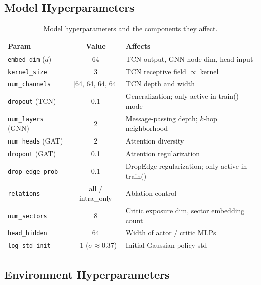 \documentclass[11pt,a4paper]{article}
\begin{document}
\subsection{Model Hyperparameters}

\begin{table}[h]
\centering
\small
\caption{Model hyperparameters and the components they affect.}
\begin{tabularx}{\textwidth}{l c X}
\toprule
\textbf{Param} & \textbf{Value} & \textbf{Affects} \\
\midrule
\texttt{embed\_dim} ($d$) & 64 & TCN output, GNN node dim, head input \\
\texttt{kernel\_size} & 3 & TCN receptive field $\propto$ kernel \\
\texttt{num\_channels} & [64, 64, 64, 64] & TCN depth and width \\
\texttt{dropout} (TCN) & 0.1 & Generalization; only active in train() mode \\
\texttt{num\_layers} (GNN) & 2 & Message-passing depth; $k$-hop neighborhood \\
\texttt{num\_heads} (GAT) & 2 & Attention diversity \\
\texttt{dropout} (GAT) & 0.1 & Attention regularization \\
\texttt{drop\_edge\_prob} & 0.1 & DropEdge regularization; only active in train() \\
\texttt{relations} & all / intra\_only & Ablation control \\
\texttt{num\_sectors} & 8 & Critic exposure dim, sector embedding count \\
\texttt{head\_hidden} & 64 & Width of actor / critic MLPs \\
\texttt{log\_std\_init} & $-1$ ($\sigma \approx 0.37$) & Initial Gaussian policy std \\
\bottomrule
\end{tabularx}
\end{table}

\subsection{Environment Hyperparameters}
\end{document}
